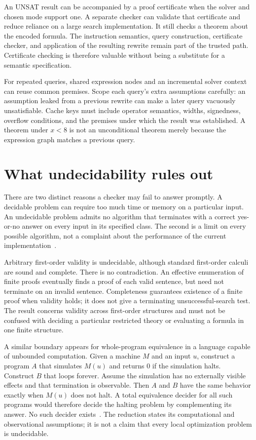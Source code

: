 An UNSAT result can be accompanied by a proof certificate when the solver and chosen mode support one.
A separate checker can validate that certificate and reduce reliance on a large search implementation.
It still checks a theorem about the encoded formula.
The instruction semantics, query construction, certificate checker, and application of the resulting rewrite remain part of the trusted path.
Certificate checking is therefore valuable without being a substitute for a semantic specification.

For repeated queries, shared expression nodes and an incremental solver context can reuse common premises.
Scope each query's extra assumptions carefully: an assumption leaked from a previous rewrite can make a later query vacuously unsatisfiable.
Cache keys must include operator semantics, widths, signedness, overflow conditions, and the premises under which the result was established.
A theorem under $x<8$ is not an unconditional theorem merely because the expression graph matches a previous query.

\section{What undecidability rules out}
\label{sec:ch41-limits}

There are two distinct reasons a checker may fail to answer promptly.
A decidable problem can require too much time or memory on a particular input.
An undecidable problem admits no algorithm that terminates with a correct yes-or-no answer on every input in its specified class.
The second is a limit on every possible algorithm, not a complaint about the performance of the current implementation~\cite{boolos-2007-computability}.

Arbitrary first-order validity is undecidable, although standard first-order calculi are sound and complete.
There is no contradiction.
An effective enumeration of finite proofs eventually finds a proof of each valid sentence, but need not terminate on an invalid sentence.
Completeness guarantees existence of a finite proof when validity holds; it does not give a terminating unsuccessful-search test.
The result concerns validity across first-order structures and must not be confused with deciding a particular restricted theory or evaluating a formula in one finite structure.

A similar boundary appears for whole-program equivalence in a language capable of unbounded computation.
Given a machine $M$ and an input $u$, construct a program $A$ that simulates $M(u)$ and returns $0$ if the simulation halts.
Construct $B$ that loops forever.
Assume the simulation has no externally visible effects and that termination is observable.
Then $A$ and $B$ have the same behavior exactly when $M(u)$ does not halt.
A total equivalence decider for all such programs would therefore decide the halting problem by complementing its answer.
No such decider exists~\cite{boolos-2007-computability}.
The reduction states its computational and observational assumptions; it is not a claim that every local optimization problem is undecidable.

